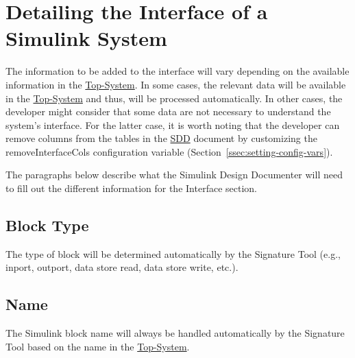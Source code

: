 \documentclass{mcscert}
\newcommand{\simulink}{Simulink}
\newcommand{\sigtool}{Signature Tool}
\newcommand{\sddtool}{Simulink Design Documenter}
\newcommand{\topsystemnolink}{Top-System} %
\newcommand{\topsystem}{\hyperref[def:topsystem]{\topsystemnolink{}}}
\begin{document}
\section{Detailing the Interface of a \simulink{} System} 
\label{sec:interface-details}
The information to be added to the interface will vary depending on the available information in the \topsystem{}. 
In some cases, the relevant data will be available in the \topsystem{} and thus, will be processed automatically. 
In other cases, the developer might consider that some data are not necessary to understand the system's interface. 
For the latter case, it is worth noting that the developer can remove columns from the tables in the \hyperref[acr:sdd]{SDD} document by customizing the removeInterfaceCols configuration variable (Section~\ref{ssec:setting-config-vars}).
    
The paragraphs below describe what the \sddtool{} will need to fill out the different information for the Interface section.
	  
	\subsection{Block Type} 
	\label{ssec:include-int-blk-type}
	The type of block will be determined automatically by the \sigtool{} (e.g., inport, outport, data store read, data store write, etc.).

	\subsection{Name}
	\label{ssec:include-int-name}
	The \simulink{} block name will always be handled automatically by the \sigtool{} based on the name in the \topsystem{}.
	  
\end{document}
